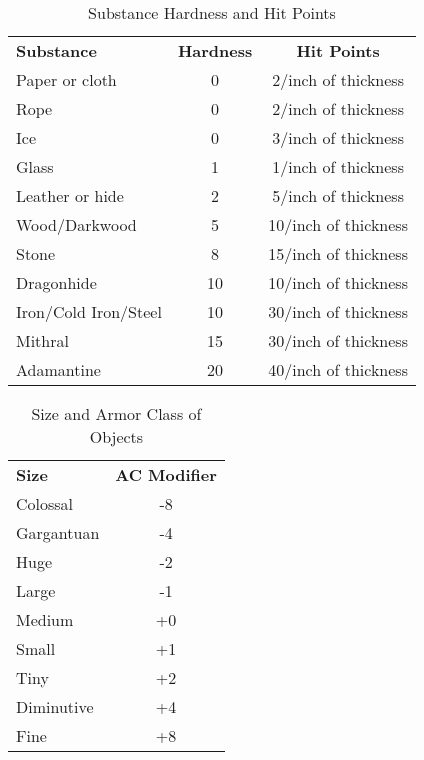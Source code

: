 \begin{table}[htb]
\caption{Substance Hardness and Hit Points}
\centering
\begin{tabular}{l c c}
\textbf{Substance} & \textbf{Hardness} & \textbf{Hit Points}\\
Paper or cloth & 0 & 2/inch of thickness\\
Rope & 0 & 2/inch of thickness\\
Ice & 0 & 3/inch of thickness\\
Glass & 1 & 1/inch of thickness\\
Leather or hide & 2 & 5/inch of thickness\\
Wood/Darkwood & 5 & 10/inch of thickness\\
Stone & 8 & 15/inch of thickness\\
Dragonhide & 10 & 10/inch of thickness\\
Iron/Cold Iron/Steel & 10 & 30/inch of thickness\\
Mithral & 15 & 30/inch of thickness\\
Adamantine & 20 & 40/inch of thickness\\
\end{tabular}
\end{table}

\begin{table}[htb]
\caption{Size and Armor Class of Objects}
\centering
\begin{tabular}{l c}
\textbf{Size} & \textbf{AC Modifier}\\
Colossal & -8\\
Gargantuan & -4\\
Huge & -2\\
Large & -1\\
Medium & +0\\
Small & +1\\
Tiny & +2\\
Diminutive & +4\\
Fine & +8\\
\end{tabular}
\end{table}


